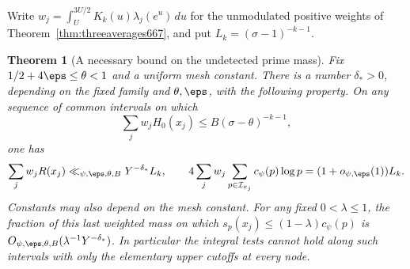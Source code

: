 \documentclass[a4paper,11pt]{article}
\newtheorem{theorem}[proposition]{Theorem}
\theoremstyle{definition}
\theoremstyle{remark}
\numberwithin{equation}{section}
\begin{document}
Write \(w_j=\int_U^{3U/2}K_k(u)\lambda_j(e^u)\,du\) for the
unmodulated positive weights of Theorem~\ref{thm:threeaverages667},
and put \(L_k=(\sigma-1)^{-k-1}\).

\begin{theorem}[A necessary bound on the undetected prime mass]
\leavevmode\label{thm:missedmass671}
Fix \(1/2+4\eps\le\theta<1\) and a uniform mesh constant.
There is a number \(\delta_*>0\), depending on the fixed
family and \(\theta,\eps\), with the following property.
On any sequence of common intervals on which
\[
              \sum_j w_jH_0(x_j)\le B(\sigma-\theta)^{-k-1},
\]
one has
\[
 \sum_j w_jR(x_j)\ll_{\psi,\eps,\theta,B}Y^{-\delta_*}L_k,
 \qquad
 4\sum_jw_j\sum_{p\in\mathcal I_{x_j}}c_\psi(p)\log p
                         =(1+o_{\psi,\eps}(1))L_k .
\]
Constants may also depend on the mesh constant. For any fixed
\(0<\lambda\le1\), the fraction of this last weighted mass on
which \(s_p(x_j)\le(1-\lambda)c_\psi(p)\) is
\(O_{\psi,\eps,\theta,B}(\lambda^{-1}Y^{-\delta_*})\).
In particular the integral tests cannot hold along such intervals
with only the elementary upper cutoffs at every node.
\end{theorem}
\end{document}
